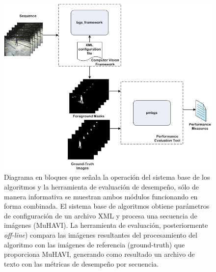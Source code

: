 \begin{figure}[h!]
\centering
\includegraphics[scale=0.5]{img/ch5/block_diagram_application}
\caption[Diagrama en bloques de operación de ambos elementos, sistema base de algoritmos y herramienta de evaluación de desempeño]{Diagrama en bloques que señala la operación del sistema base de los algoritmos y la herramienta de evaluación de desempeño, sólo de manera informativa se muestran ambos módulos funcionando en forma combinada. El sistema base de algoritmos obtiene parámetros de configuración de un archivo XML y procesa una secuencia de imágenes (MuHAVI). La herramienta de evaluación, posteriormente \textit{off-line}) compara las imágenes resultantes del procesamiento del algoritmo con las imágenes de referencia (ground-truth) que proporciona MuHAVI, generando como resultado un archivo de texto con las métricas de desempeño por secuencia. }
\label{fig:diagrama_bloques}
\end{figure}

